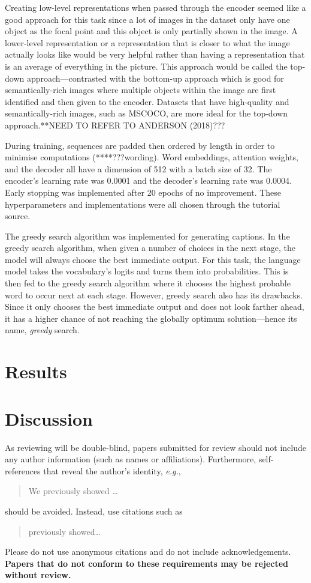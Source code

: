 \documentclass[11pt,a4paper]{article}
\begin{document}
Creating low-level representations when passed through the encoder seemed like a good approach for this task since a lot of images in the dataset only have one object as the focal point and this object is only partially shown in the image. A lower-level representation or a representation that is closer to what the image actually looks like would be very helpful rather than having a representation that is an average of everything in the picture. This approach would be called the top-down approach—contrasted with the bottom-up approach which is good for semantically-rich images where multiple objects within the image are first identified and then given to the encoder. Datasets that have high-quality and semantically-rich images, such as MSCOCO, are more ideal for the top-down approach.**NEED TO REFER TO ANDERSON (2018)??? 

During training, sequences are padded then ordered by length in order to minimise computations (****???wording). Word embeddings, attention weights, and the decoder all have a dimension of 512 with a batch size of 32. The encoder’s learning rate was 0.0001 and the decoder’s learning rate was 0.0004. Early stopping was implemented after 20 epochs of no improvement. These hyperparameters and implementations were all chosen through the tutorial source.  

The greedy search algorithm was implemented for generating captions. In the greedy search algorithm, when given a number of choices in the next stage, the model will always choose the best immediate output. For this task, the language model takes the vocabulary’s logits and turns them into probabilities. This is then fed to the greedy search algorithm where it chooses the highest probable word to occur next at each stage. However, greedy search also has its drawbacks. Since it only chooses the best immediate output and does not look farther ahead, it has a higher chance of not reaching the globally optimum solution—hence its name, \emph{greedy} search.



\section{Results}
\label{sec:results}


\section{Discussion}
As reviewing will be double-blind, papers submitted for review should not include any author information (such as names or affiliations). Furthermore, self-references that reveal the author's identity, \emph{e.g.},
\begin{quote}
We previously showed \citep{Gusfield:97} \ldots
\end{quote}
should be avoided. Instead, use citations such as 
\begin{quote}
\citet{Gusfield:97} previously showed\ldots
\end{quote}
Please do not use anonymous citations and do not include acknowledgements.
\textbf{Papers that do not conform to these requirements may be rejected without review.}
\end{document}
